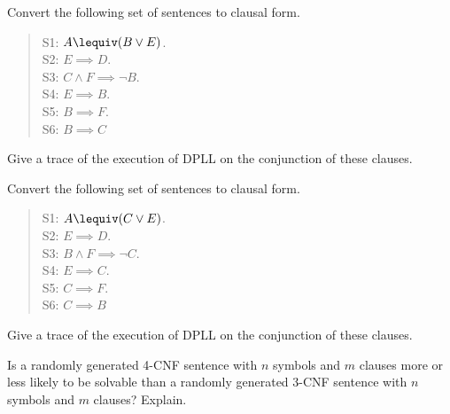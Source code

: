 \begin{uexercise}
Convert the following set of sentences to clausal form.
\begin{quote}
S1: \(A \lequiv (B \lor E)\). \\
S2: \(E \implies D\). \\
S3: \(C \land F \implies \lnot B\). \\
S4: \(E \implies B\). \\
S5: \(B \implies F\). \\
S6: \(B \implies C\)
\end{quote}
Give a trace of the execution of DPLL on the conjunction of
these clauses.  
\end{uexercise} 

\begin{iexercise}
Convert the following set of sentences to clausal form.
\begin{quote}
S1: \(A \lequiv (C \lor E)\). \\
S2: \(E \implies D\). \\
S3: \(B \land F \implies \lnot C\). \\
S4: \(E \implies C\). \\
S5: \(C \implies F\). \\
S6: \(C \implies B\)
\end{quote}
Give a trace of the execution of DPLL on the conjunction of
these clauses.  
\end{iexercise} 

\begin{exercise}
Is a randomly generated 4-CNF sentence with \(n\) symbols and \(m\) clauses more or
less likely to be solvable than 
a randomly generated 3-CNF sentence with \(n\) symbols and \(m\) clauses? Explain.
\end{exercise} 

